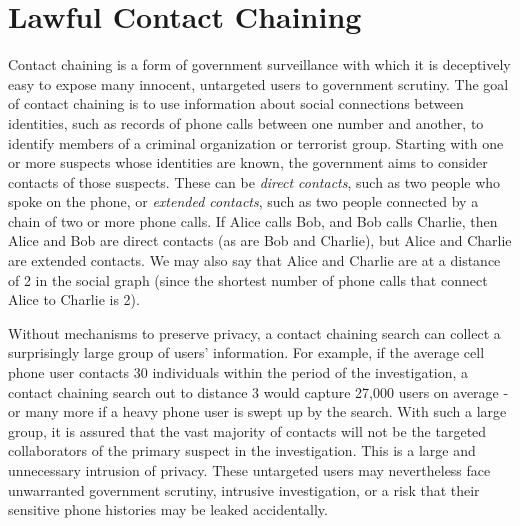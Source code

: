 \section{Lawful Contact Chaining}\label{sec-chaining}
Contact chaining is a form of government surveillance with which it is deceptively easy to expose many innocent, untargeted users to government scrutiny. The goal of contact chaining is to use information about social connections between identities, such as records of phone calls between one number and another, to identify members of a criminal organization or terrorist group. Starting with one or more suspects whose identities are known, the government aims to consider contacts of those suspects. These can be \emph{direct contacts}, such as two people who spoke on the phone, or \emph{extended contacts}, such as two people connected by a chain of two or more phone calls. If Alice calls Bob, and Bob calls Charlie, then Alice and Bob are direct contacts (as are Bob and Charlie), but Alice and Charlie are extended contacts. We may also say that Alice and Charlie are at a distance of 2 in the social graph (since the shortest number of phone calls that connect Alice to Charlie is 2).



Without mechanisms to preserve privacy, a contact chaining search can collect a surprisingly large group of users' information. For example, if the average cell phone user contacts 30 individuals within the period of the investigation, a contact chaining search out to distance 3 would capture 27,000 users on average - or many more if a heavy phone user is swept up by the search. With such a large group, it is assured that the vast majority of contacts will not be the targeted collaborators of the primary suspect in the investigation. This is a large and unnecessary intrusion of privacy. These untargeted users may nevertheless face unwarranted government scrutiny, intrusive investigation, or a risk that their sensitive phone histories may be leaked accidentally.



